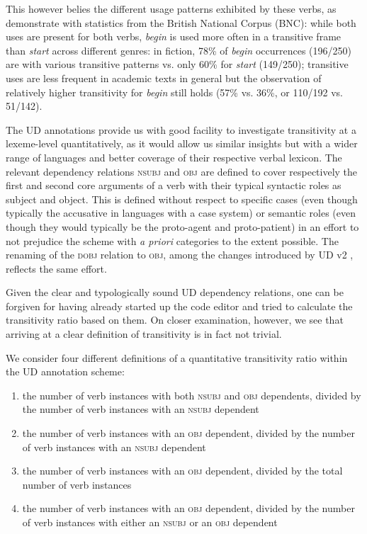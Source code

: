 This however belies the different usage patterns exhibited by these verbs, as \citet[95]{biber1998} demonstrate with statistics from the British National Corpus (BNC): while both uses are present for both verbs, \textit{begin} is used more often in a transitive frame than \textit{start} across different genres: in fiction, 78\% of \textit{begin} occurrences (196/250) are with various transitive patterns vs. only 60\% for \textit{start} (149/250); transitive uses are less frequent in academic texts in general but the observation of relatively higher transitivity for \textit{begin} still holds (57\% vs. 36\%, or 110/192 vs. 51/142).


The UD annotations provide us with good facility to investigate transitivity at a lexeme-level quantitatively, as it would allow us similar insights but with a wider range of languages and better coverage of their respective verbal lexicon. The relevant dependency relations \textsc{nsubj} and \textsc{obj} are defined to cover respectively the first and second core arguments of a verb with their typical syntactic roles as subject and object. This is defined without respect to specific cases (even though typically the accusative in languages with a case system) or semantic roles (even though they would typically be the proto-agent and proto-patient) in an effort to not prejudice the scheme with \textit{a priori} categories to the extent possible. The renaming of the \textsc{dobj} relation to \textsc{obj}, among the changes introduced by UD v2 \citep{nivre2020}, reflects the same effort.

Given the clear and typologically sound UD dependency relations, one can be forgiven for having already started up the code editor and tried to calculate the transitivity ratio based on them. On closer examination, however, we see that arriving at a clear definition of transitivity is in fact not trivial.

We consider four different definitions of a quantitative transitivity ratio within the UD annotation scheme:

\begin{enumerate}
    \item the number of verb instances with both \textsc{nsubj} and \textsc{obj} dependents, divided by the number of verb instances with an \textsc{nsubj} dependent
    \item the number of verb instances with an \textsc{obj} dependent, divided by the number of verb instances with an \textsc{nsubj} dependent
    \item the number of verb instances with an \textsc{obj} dependent, divided by the total number of verb instances
    \item the number of verb instances with an \textsc{obj} dependent, divided by the number of verb instances with either an \textsc{nsubj} or an \textsc{obj} dependent
\end{enumerate}

